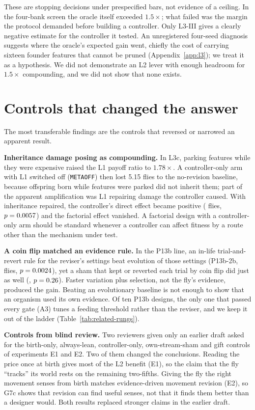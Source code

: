 \documentclass[11pt]{article}
\begin{document}
These are stopping decisions under prespecified bars, not evidence of a ceiling. In the four-bank screen the oracle itself exceeded $1.5\times$; what failed was the margin the protocol demanded before building a controller. Only L3-III gives a clearly negative estimate for the controller it tested. An unregistered four-seed diagnosis suggests where the oracle's expected gain went, chiefly the cost of carrying sixteen founder features that cannot be pruned (Appendix~\ref{app:l3}); we treat it as a hypothesis. We did not demonstrate an L2 lever with enough headroom for $1.5\times$ compounding, and we did not show that none exists.

\section{Controls that changed the answer}
\label{sec:controls}

The most transferable findings are the controls that reversed or narrowed an apparent result.

\textbf{Inheritance damage posing as compounding.} In L3c, parking features while they were expensive raised the L1 payoff ratio to $1.78\times$. A controller-only arm with L1 switched off (\texttt{METAOFF}) then lost 5.15 flies to the no-revision baseline, because offspring born while features were parked did not inherit them; part of the apparent amplification was L1 repairing damage the controller caused. With inheritance repaired, the controller's direct effect became positive (\LthreeImetaoffMean{} flies, $p = 0.0057$) and the factorial effect vanished. A factorial design with a controller-only arm should be standard whenever a controller can affect fitness by a route other than the mechanism under test.

\textbf{A coin flip matched an evidence rule.} In the P13b line, an in-life trial-and-revert rule for the reviser's settings beat evolution of those settings (P13b-2b, \PthirteenTwoBEvorMean{} flies, $p = 0.0024$), yet a sham that kept or reverted each trial by coin flip did just as well (\PthirteenTwoBShamMean, $p = 0.26$). Faster variation plus selection, not the fly's evidence, produced the gain. Beating an evolutionary baseline is not enough to show that an organism used its own evidence. Of ten P13b designs, the only one that passed every gate (A3) tunes a feeding threshold rather than the reviser, and we keep it out of the ladder (Table~\ref{tab:related-rungs}).

\textbf{Controls from blind review.} Two reviewers given only an earlier draft asked for the birth-only, always-lean, controller-only, own-stream-sham and gift controls of experiments E1 and E2. Two of them changed the conclusions. Reading the price once at birth gives most of the L2 benefit (E1), so the claim that the fly ``tracks'' its world rests on the remaining two-fifths. Giving the fly the right movement senses from birth matches evidence-driven movement revision (E2), so G7c shows that revision can find useful senses, not that it finds them better than a designer would. Both results replaced stronger claims in the earlier draft.
\end{document}

